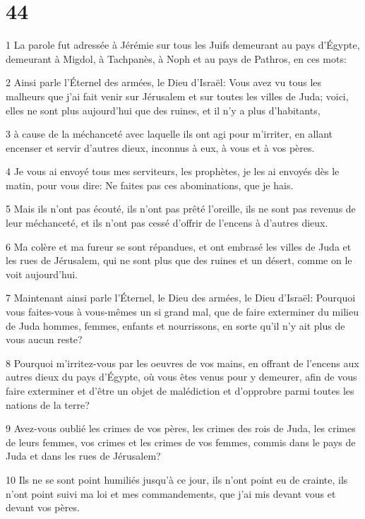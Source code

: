 \chapter{44}

\par 1 La parole fut adressée à Jérémie sur tous les Juifs demeurant au pays d'Égypte, demeurant à Migdol, à Tachpanès, à Noph et au pays de Pathros, en ces mots:
\par 2 Ainsi parle l'Éternel des armées, le Dieu d'Israël: Vous avez vu tous les malheurs que j'ai fait venir sur Jérusalem et sur toutes les villes de Juda; voici, elles ne sont plus aujourd'hui que des ruines, et il n'y a plus d'habitants,
\par 3 à cause de la méchanceté avec laquelle ils ont agi pour m'irriter, en allant encenser et servir d'autres dieux, inconnus à eux, à vous et à vos pères.
\par 4 Je vous ai envoyé tous mes serviteurs, les prophètes, je les ai envoyés dès le matin, pour vous dire: Ne faites pas ces abominations, que je hais.
\par 5 Mais ils n'ont pas écouté, ils n'ont pas prêté l'oreille, ils ne sont pas revenus de leur méchanceté, et ils n'ont pas cessé d'offrir de l'encens à d'autres dieux.
\par 6 Ma colère et ma fureur se sont répandues, et ont embrasé les villes de Juda et les rues de Jérusalem, qui ne sont plus que des ruines et un désert, comme on le voit aujourd'hui.
\par 7 Maintenant ainsi parle l'Éternel, le Dieu des armées, le Dieu d'Israël: Pourquoi vous faites-vous à vous-mêmes un si grand mal, que de faire exterminer du milieu de Juda hommes, femmes, enfants et nourrissons, en sorte qu'il n'y ait plus de vous aucun reste?
\par 8 Pourquoi m'irritez-vous par les oeuvres de vos mains, en offrant de l'encens aux autres dieux du pays d'Égypte, où vous êtes venus pour y demeurer, afin de vous faire exterminer et d'être un objet de malédiction et d'opprobre parmi toutes les nations de la terre?
\par 9 Avez-vous oublié les crimes de vos pères, les crimes des rois de Juda, les crimes de leurs femmes, vos crimes et les crimes de vos femmes, commis dans le pays de Juda et dans les rues de Jérusalem?
\par 10 Ils ne se sont point humiliés jusqu'à ce jour, ils n'ont point eu de crainte, ils n'ont point suivi ma loi et mes commandements, que j'ai mis devant vous et devant vos pères.
